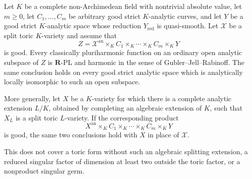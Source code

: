 
\begin{corollary}
\label{cor:p061-toric-arbitrary-curve-factor-products}
Let $K$ be a complete non-Archimedean field with nontrivial absolute
value, let $m\geq0$, let $C_1,\ldots,C_m$ be arbitrary good strict
$K$-analytic curves, and let $Y$ be a good strict $K$-analytic space whose
reduction $Y_{\mathrm{red}}$ is quasi-smooth.  Let $\mathcal X$ be a split
toric $K$-variety and assume that
\[
 Z=\mathcal X^{\mathrm{an}}\times_K C_1\times_K\cdots
      \times_K C_m\times_KY
\]
is good.  Every classically pluriharmonic function on an ordinary open
analytic subspace of $Z$ is $\mathbf R$-PL and harmonic in the sense of
Gubler--Jell--Rabinoff.  The same conclusion holds on every good strict
analytic space which is analytically locally isomorphic to such an open
subspace.

More generally, let $X$ be a $K$-variety for which there is a complete
analytic extension $L/K$, obtained by completing an algebraic extension of
$K$, such that $X_L$ is a split toric $L$-variety.  If the corresponding
product
\[
 X^{\mathrm{an}}\times_K C_1\times_K\cdots
      \times_K C_m\times_KY
\]
is good, the same two conclusions hold with $X$ in place of $\mathcal X$.

This does not cover a toric form without such an algebraic splitting
extension, a reduced singular factor of dimension at least two outside the
toric factor, or a nonproduct singular germ.
\end{corollary}
